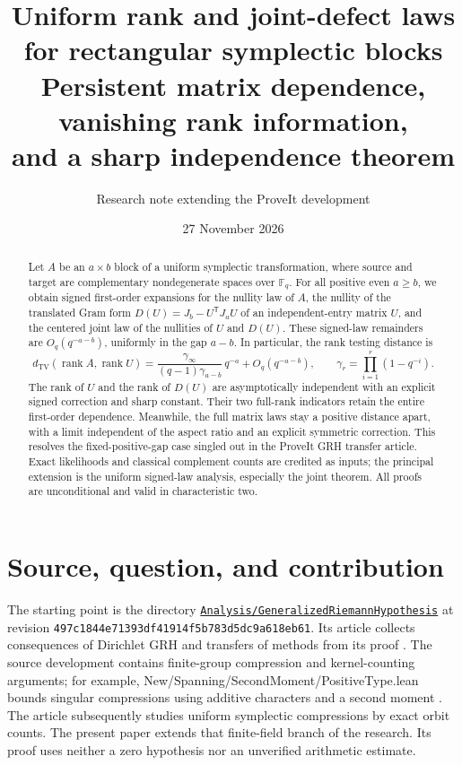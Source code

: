 \documentclass[11pt]{article}
\title{\vspace{-1em}\textbf{Uniform rank and joint-defect laws\\for rectangular symplectic blocks}\\[0.5em]
\large Persistent matrix dependence, vanishing rank information,\\and a sharp independence theorem}
\author{Research note extending the ProveIt development}
\date{27 November 2026}
\theoremstyle{definition}
\newcommand{\F}{\mathbb F_q}
\newcommand{\TV}{d_{\mathrm{TV}}}
\newcommand{\rank}{\operatorname{rank}}
\newcommand{\trans}{\mathsf T}
\newcommand{\gitsha}{\texttt{497c1844e71393df41914f5b783d5dc9a618eb61}}
\newcommand{\srcid}[1]{{\footnotesize\ttfamily #1}}
\begin{document}
\maketitle
\begin{abstract}
Let \(A\) be an \(a\times b\) block of a uniform symplectic transformation,
where source and target are complementary nondegenerate spaces over \(\F\).
For all positive even \(a\ge b\), we obtain signed first-order expansions for
the nullity law of \(A\), the nullity of the translated Gram form
\(D(U)=J_b-U^{\trans}J_aU\) of an independent-entry matrix \(U\), and the
centered joint law of the nullities of \(U\) and \(D(U)\).
These signed-law remainders are \(O_q(q^{-a-b})\), uniformly in the
gap \(a-b\). In particular, the rank testing distance is
\[
 \TV(\rank A,\rank U)
 =\frac{\gamma_\infty}{(q-1)\gamma_{a-b}}\,q^{-a}
   +O_q(q^{-a-b}),\qquad
 \gamma_r=\prod_{i=1}^r(1-q^{-i}).
\]
The rank of \(U\) and the rank of \(D(U)\) are asymptotically independent with
an explicit signed correction and sharp constant. Their two full-rank
indicators retain the entire first-order dependence.
Meanwhile, the full matrix laws stay a positive distance apart, with a
limit independent of the aspect ratio and an explicit symmetric correction.
This resolves the fixed-positive-gap case singled out in the
ProveIt GRH transfer article. Exact likelihoods and classical complement
counts are credited as inputs; the principal extension is the uniform
signed-law analysis, especially the joint theorem.
All proofs are unconditional and valid in characteristic two.
\end{abstract}

\section{Source, question, and contribution}\label{sec:source}

The starting point is the directory
\href{https://github.com/VladimirReshetnikov/ProveIt/tree/497c1844e71393df41914f5b783d5dc9a618eb61/Analysis/GeneralizedRiemannHypothesis}{\texttt{Analysis/GeneralizedRiemannHypothesis}}
at revision \gitsha.
Its article collects consequences of Dirichlet GRH and transfers of methods
from its proof \cite{ProveIt}. The source development contains finite-group
compression and kernel-counting arguments; for example,
\srcid{New/Spanning/SecondMoment/PositiveType.lean} bounds singular
compressions using additive characters and a second moment \cite{GRHSource}.
The article subsequently studies uniform symplectic compressions by exact
orbit counts. The present paper extends that finite-field branch of the
research. Its proof uses neither a zero hypothesis nor an unverified
arithmetic estimate.
\end{document}
